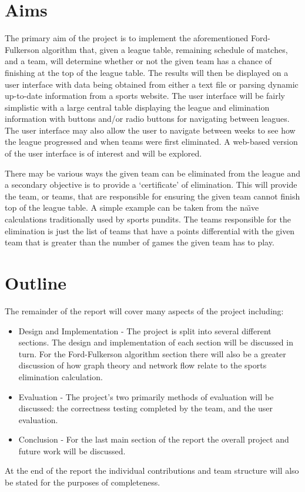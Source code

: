 \section{Aims}

The primary aim of the project is to implement the aforementioned
Ford-Fulkerson algorithm that, given a league table, remaining schedule of
matches, and a team, will determine whether or not the given team has a
chance of finishing at the top of the league table. The results will then
be displayed on a user interface with data being obtained from either a text
file or parsing dynamic up-to-date information from a sports website. The user
interface will be fairly simplistic with a large central table displaying the
league and elimination information with buttons and/or radio buttons for
navigating between leagues. The user interface may also allow the user to
navigate between weeks to see how the league progressed and when teams were
first eliminated. A web-based version of the user interface is of interest and
will be explored.

There may be various ways the given team can be eliminated from the league
and a secondary objective is to provide a `certificate' of elimination. This
will provide the team, or teams, that are responsible for ensuring the given
team cannot finish top of the league table. A simple example can be taken
from the na\"{\i}ve calculations traditionally used by sports pundits. The
teams responsible for the elimination is just the list of teams that have a
points differential with the given team that is greater than the number of
games the given team has to play.

\section{Outline}

The remainder of the report will cover many aspects of the project including:

\begin{itemize}
\item Design and Implementation - The project is split into several different
sections. The design and implementation of each section will be discussed in
turn. For the Ford-Fulkerson algorithm section there will also be a greater
discussion of how graph theory and network flow relate to the sports
elimination calculation.
\item Evaluation - The project's two primarily methods of evaluation will be
discussed: the correctness testing completed by the team, and the user
evaluation.
\item Conclusion - For the last main section of the report the overall
project and future work will be discussed.
\end{itemize}

At the end of the report the individual contributions and team structure will
also be stated for the purposes of completeness.